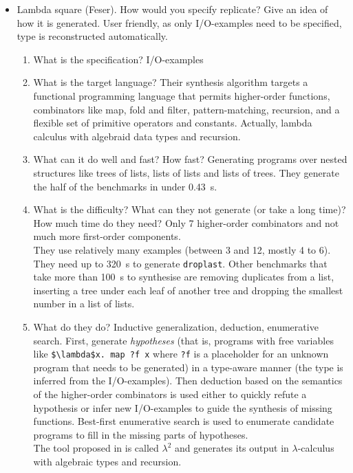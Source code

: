 \begin{itemize}
\begin{enumerate}
\end{enumerate}
\item Lambda square (Feser). How would you specify replicate? Give an idea of how it is generated. User friendly, as only I/O-examples need to be specified, type is reconstructed automatically.
\begin{enumerate}
\item What is the specification?
I/O-examples
\item What is the target language?
Their synthesis algorithm targets a functional programming language that permits higher-order functions, combinators like map, fold and filter, pattern-matching, recursion, and a flexible set of primitive operators and constants. Actually, lambda calculus with algebraid data types and recursion.
\item What can it do well and fast? How fast?
Generating programs over nested structures like trees of lists, lists of lists and lists of trees. They generate the half of the benchmarks in under 0.43~s.
\item What is the difficulty? What can they not generate (or take a long time)? How much time do they need?
Only 7 higher-order combinators and not much more first-order components.\\
They use relatively many examples (between 3 and 12, mostly 4 to 6).\\
They need up to 320~s to generate \lstinline?droplast?. Other benchmarks that take more than 100~s to synthesise are removing duplicates from a list, inserting a tree under each leaf of another tree and dropping the smallest number in a list of lists.
\item What do they do?
Inductive generalization, deduction, enumerative search.
First, generate \emph{hypotheses} (that is, programs with free variables like \lstinline!$\lambda$x. map ?f x! where \lstinline!?f! is a placeholder for an unknown program that needs to be generated) in a type-aware manner (the type is inferred from the I/O-examples). Then deduction based on the semantics of the higher-order combinators is used either to quickly refute a hypothesis or infer new I/O-examples to guide the synthesis of missing functions. Best-first enumerative search is used to enumerate candidate programs to fill in the missing parts of hypotheses.\\
The tool proposed in \cite{LambdaSquarePaper} is called $\lambda^2$ and generates its output in $\lambda$-calculus with algebraic types and recursion.

\end{enumerate}
\end{itemize}
